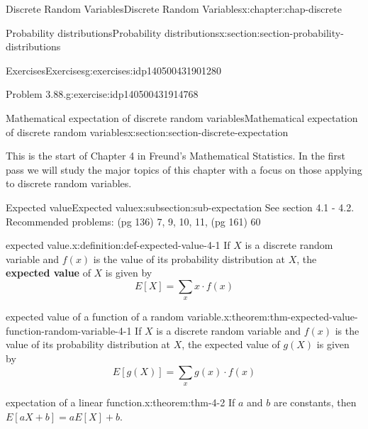 \documentclass[oneside,10pt,]{book}
\newcommand{\terminology}[1]{\textbf{#1}}
\begin{document}
\begin{chapterptx}{Discrete Random Variables}{}{Discrete Random Variables}{}{}{x:chapter:chap-discrete}
\begin{sectionptx}{Probability distributions}{}{Probability distributions}{}{}{x:section:section-probability-distributions}
\begin{exercises-subsection}{Exercises}{}{Exercises}{}{}{g:exercises:idp140500431901280}
\begin{divisionexercise}{8}{Problem 3.88.}{}{g:exercise:idp140500431914768}
\begin{enumerate}[label=(\alph*)]
\end{enumerate}
%
\end{divisionexercise}%
\end{exercises-subsection}
\end{sectionptx}
%
%
\typeout{************************************************}
\typeout{************************************************}
%
\begin{sectionptx}{Mathematical expectation of discrete random variables}{}{Mathematical expectation of discrete random variables}{}{}{x:section:section-discrete-expectation}
\begin{introduction}{}%
This is the start of Chapter 4 in Freund's Mathematical Statistics. In the first pass we will study the major topics of this chapter with a focus on those applying to discrete random variables.%
\end{introduction}%
%
%
\typeout{************************************************}
\typeout{************************************************}
%
\begin{subsectionptx}{Expected value}{}{Expected value}{}{}{x:subsection:sub-expectation}
See section 4.1 - 4.2. Recommended problems: (pg 136) 7, 9, 10, 11, (pg 161) 60%
\begin{definition}{expected value.}{x:definition:def-expected-value-4-1}%
If \(X\) is a discrete random variable and \(\displaystyle f(x)\) is the value of its probability distribution at \(X\), the \terminology{expected value} of \(X\) is given by%
\begin{equation*}
E[X] = \sum_x x\cdot f(x)
\end{equation*}
%
\end{definition}
\begin{theorem}{expected value of a function of a random variable.}{}{x:theorem:thm-expected-value-function-random-variable-4-1}%
If \(X\) is a discrete random variable and \(\displaystyle f(x)\) is the value of its probability distribution at \(X\), the expected value of \(\displaystyle
g(X)\) is given by%
\begin{equation*}
E[g(X)] = \sum_x g(x)\cdot f(x)
\end{equation*}
%
\end{theorem}
\begin{theorem}{expectation of a linear function.}{}{x:theorem:thm-4-2}%
If \(\displaystyle a\) and \(\displaystyle b\) are constants, then \(\displaystyle E[aX +b] = aE[X]+b\).%

\end{theorem}
\end{subsectionptx}
\end{sectionptx}
\end{chapterptx}
\end{document}
